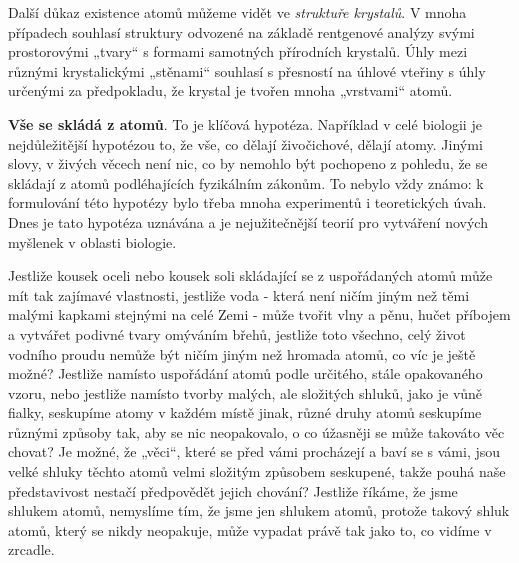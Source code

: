       Další důkaz existence atomů můžeme vidět ve \emph{struktuře krystalů}. V mnoha případech 
      souhlasí struktury odvozené na základě rentgenové analýzy svými prostorovými „tvary“ s 
      formami samotných přírodních krystalů. Úhly mezi různými krystalickými „stěnami“ souhlasí s 
      přesností na úhlové vteřiny s úhly určenými za předpokladu, že krystal je tvořen mnoha 
      „vrstvami“ atomů.
      
      \textbf{Vše se skládá z atomů}. To je klíčová hypotéza. Například v celé biologii je 
      nejdůležitější hypotézou to, že vše, co dělají živočichové, dělají atomy. Jinými slovy, v 
      živých věcech není nic, co by nemohlo být pochopeno z pohledu, že se skládají z atomů 
      podléhajících fyzikálním zákonům. To nebylo vždy známo: k formulování této hypotézy bylo 
      třeba mnoha experimentů i teoretických úvah. Dnes je tato hypotéza uznávána a je 
      nejužitečnější teorií pro vytváření nových myšlenek v oblasti biologie.
      
      Jestliže kousek oceli nebo kousek soli skládající se z uspořádaných atomů může mít tak 
      zajímavé vlastnosti, jestliže voda - která není ničím jiným než těmi malými kapkami stejnými 
      na celé Zemi - může tvořit vlny a pěnu, hučet příbojem a vytvářet podivné tvary omýváním 
      břehů, jestliže toto všechno, celý život vodního proudu nemůže být ničím jiným než hromada 
      atomů, co víc je ještě možné? Jestliže namísto uspořádání atomů podle určitého, stále 
      opakovaného vzoru, nebo jestliže namísto tvorby malých, ale složitých shluků, jako je vůně 
      fialky, seskupíme atomy v každém místě jinak, různé druhy atomů seskupíme různými způsoby 
      tak, aby se nic neopakovalo, o co úžasněji se může takováto věc chovat? Je možné, že „věci“, 
      které se před vámi procházejí a baví se s vámi, jsou velké shluky těchto atomů velmi složitým 
      způsobem seskupené, takže pouhá naše představivost nestačí předpovědět jejich chování? 
      Jestliže říkáme, že jsme shlukem atomů, nemyslíme tím, že jsme jen shlukem atomů, protože 
      takový shluk atomů, který se nikdy neopakuje, může vypadat právě tak jako to, co vidíme v 
      zrcadle.
